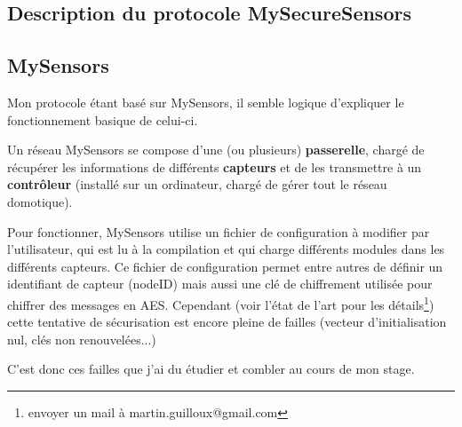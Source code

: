\documentclass[12 pt]{report}
\begin{document}
\begin{appendix}
\chapter{Description du protocole MySecureSensors}
\section{MySensors} 
Mon protocole étant basé sur MySensors, il semble logique d'expliquer le fonctionnement basique de celui-ci.

Un réseau MySensors se compose d'une (ou plusieurs) \textbf{passerelle}, chargé de récupérer les informations de différents \textbf{capteurs} et de les transmettre à un \textbf{contrôleur} (installé sur un ordinateur, chargé de gérer tout le réseau domotique).

Pour fonctionner, MySensors utilise un fichier de configuration à modifier par l'utilisateur, qui est lu à la compilation et qui charge différents modules dans les différents capteurs. Ce fichier de configuration permet entre autres de définir un identifiant de capteur (nodeID) mais aussi une clé de chiffrement utilisée pour chiffrer des messages en AES. Cependant (voir l'état de l'art pour les détails\footnote{envoyer un mail à martin.guilloux@gmail.com}) cette tentative de sécurisation est encore pleine de failles (vecteur d'initialisation nul, clés non renouvelées...)

C'est donc ces failles que j'ai du étudier et combler au cours de mon stage.


\end{appendix}
\end{document}
